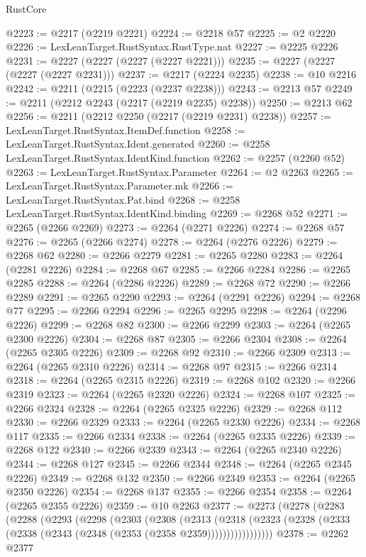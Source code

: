 \begin{lexlean}{RustCore}
\begin{coremodule}
@2223 := @2217 (@2219 @2221)
@2224 := @2218 @57
@2225 := @2 @2220
@2226 := LexLeanTarget.RustSyntax.RustType.nat
@2227 := @2225 @2226
@2231 := @2227 (@2227 (@2227 (@2227 @2221)))
@2235 := @2227 (@2227 (@2227 (@2227 @2231)))
@2237 := @2217 (@2224 @2235)
@2238 := @10 @2216
@2242 := @2211 (@2215 (@2223 (@2237 @2238)))
@2243 := @2213 @57
@2249 := @2211 (@2212 @2243 (@2217 (@2219 @2235) @2238))
@2250 := @2213 @62
@2256 := @2211 (@2212 @2250 (@2217 (@2219 @2231) @2238))
@2257 := LexLeanTarget.RustSyntax.ItemDef.function
@2258 := LexLeanTarget.RustSyntax.Ident.generated
@2260 := @2258 LexLeanTarget.RustSyntax.IdentKind.function
@2262 := @2257 (@2260 @52)
@2263 := LexLeanTarget.RustSyntax.Parameter
@2264 := @2 @2263
@2265 := LexLeanTarget.RustSyntax.Parameter.mk
@2266 := LexLeanTarget.RustSyntax.Pat.bind
@2268 := @2258 LexLeanTarget.RustSyntax.IdentKind.binding
@2269 := @2268 @52
@2271 := @2265 (@2266 @2269)
@2273 := @2264 (@2271 @2226)
@2274 := @2268 @57
@2276 := @2265 (@2266 @2274)
@2278 := @2264 (@2276 @2226)
@2279 := @2268 @62
@2280 := @2266 @2279
@2281 := @2265 @2280
@2283 := @2264 (@2281 @2226)
@2284 := @2268 @67
@2285 := @2266 @2284
@2286 := @2265 @2285
@2288 := @2264 (@2286 @2226)
@2289 := @2268 @72
@2290 := @2266 @2289
@2291 := @2265 @2290
@2293 := @2264 (@2291 @2226)
@2294 := @2268 @77
@2295 := @2266 @2294
@2296 := @2265 @2295
@2298 := @2264 (@2296 @2226)
@2299 := @2268 @82
@2300 := @2266 @2299
@2303 := @2264 (@2265 @2300 @2226)
@2304 := @2268 @87
@2305 := @2266 @2304
@2308 := @2264 (@2265 @2305 @2226)
@2309 := @2268 @92
@2310 := @2266 @2309
@2313 := @2264 (@2265 @2310 @2226)
@2314 := @2268 @97
@2315 := @2266 @2314
@2318 := @2264 (@2265 @2315 @2226)
@2319 := @2268 @102
@2320 := @2266 @2319
@2323 := @2264 (@2265 @2320 @2226)
@2324 := @2268 @107
@2325 := @2266 @2324
@2328 := @2264 (@2265 @2325 @2226)
@2329 := @2268 @112
@2330 := @2266 @2329
@2333 := @2264 (@2265 @2330 @2226)
@2334 := @2268 @117
@2335 := @2266 @2334
@2338 := @2264 (@2265 @2335 @2226)
@2339 := @2268 @122
@2340 := @2266 @2339
@2343 := @2264 (@2265 @2340 @2226)
@2344 := @2268 @127
@2345 := @2266 @2344
@2348 := @2264 (@2265 @2345 @2226)
@2349 := @2268 @132
@2350 := @2266 @2349
@2353 := @2264 (@2265 @2350 @2226)
@2354 := @2268 @137
@2355 := @2266 @2354
@2358 := @2264 (@2265 @2355 @2226)
@2359 := @10 @2263
@2377 := @2273
    (@2278
      (@2283
        (@2288
          (@2293
            (@2298
              (@2303
                (@2308
                  (@2313
                    (@2318
                      (@2323 (@2328 (@2333 (@2338 (@2343 (@2348 (@2353 (@2358 @2359)))))))))))))))))
@2378 := @2262 @2377

\end{coremodule}
\end{lexlean}
